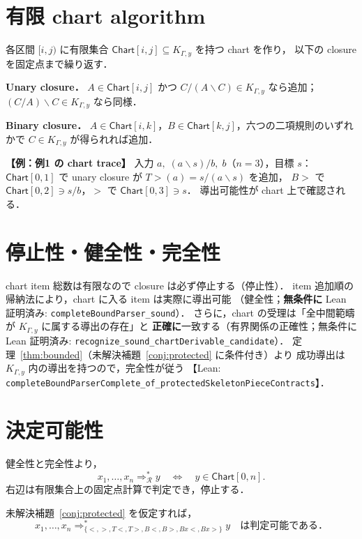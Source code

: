 \documentclass[paper=a4,fontsize=10pt,jafontscale=0.92]{jlreq}
\theoremstyle{plain}
\theoremstyle{definition}
\theoremstyle{remark}
\newcommand{\R}{\mathcal{R}}
\newcommand{\Chart}{\mathsf{Chart}}
\newcommand{\bs}{\backslash}
\newcommand{\lean}[1]{\texttt{#1}}
\begin{document}
\section{有限 chart algorithm}
\label{sec:chart-alg}

各区間 $[i,j)$ に有限集合 $\Chart[i,j]\subseteq K_{\Gamma,y}$ を持つ chart を作り，
以下の closure を固定点まで繰り返す．

\medskip
\noindent\textbf{Unary closure．}
$A\in\Chart[i,j]$ かつ $C/(A\bs C)\in K_{\Gamma,y}$ なら追加；
$(C/A)\bs C\in K_{\Gamma,y}$ なら同様．

\medskip
\noindent\textbf{Binary closure．}
$A\in\Chart[i,k]$，$B\in\Chart[k,j]$，六つの二項規則のいずれかで
$C\in K_{\Gamma,y}$ が得られれば追加．

\begin{verifybox}
\textbf{【例：例1 の chart trace】}
入力 $a,\;(a\bs s)/b,\;b$（$n=3$），目標 $s$：
$\Chart[0,1]$ で unary closure が $T{>}(a){=}s/(a\bs s)$ を追加，
$B{>}$ で $\Chart[0,2]\ni s/b$，$>$ で $\Chart[0,3]\ni s$．
導出可能性が chart 上で確認される．
\end{verifybox}

\section{停止性・健全性・完全性}

chart item 総数は有限なので closure は必ず停止する（停止性）．
item 追加順の帰納法により，chart に入る item は実際に導出可能
（健全性；\textbf{無条件に} Lean 証明済み:
\lean{completeBoundParser\_sound}）．
さらに，chart の受理は「全中間範疇が $K_{\Gamma,y}$ に属する導出の存在」と
\textbf{正確に}一致する（有界関係の正確性；無条件に Lean 証明済み:
\lean{recognize\_sound\_chartDerivable\_candidate}）．
定理~\ref{thm:bounded}（未解決補題~\ref{conj:protected} に条件付き）より
成功導出は $K_{\Gamma,y}$ 内の導出を持つので，完全性が従う
【Lean: \lean{completeBoundParserComplete\_of\_protectedSkeletonPieceContracts}】．

\section{決定可能性}

健全性と完全性より，
\[
  x_1,\ldots,x_n\Rightarrow_{\R}^{*}y
  \quad\Longleftrightarrow\quad
  y\in\Chart[0,n].
\]
右辺は有限集合上の固定点計算で判定でき，停止する．

\bigskip
\begin{tcolorbox}[
  enhanced, colback=white, colframe=black,
  boxrule=1pt, arc=2pt,
  left=8pt, right=8pt, top=6pt, bottom=6pt,
]
未解決補題~\ref{conj:protected} を仮定すれば，
\[
  x_1,\ldots,x_n
  \Rightarrow_{\{<,>,T{<},T{>},B{<},B{>},Bx{<},Bx{>}\}}^{*}
  y
  \quad\text{は判定可能である．}
\]
\end{tcolorbox}
\end{document}
